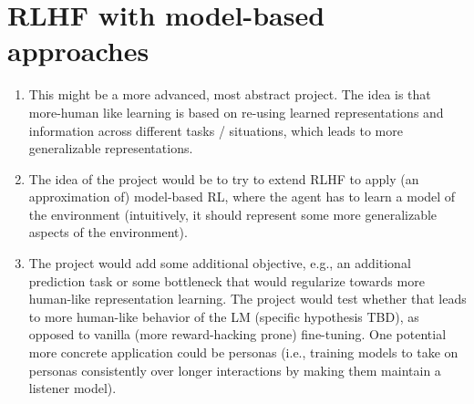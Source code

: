 \documentclass[fleqn,reqno,10pt]{article}
\begin{document}
\section{RLHF with model-based approaches}
\begin{enumerate}
	\item This might be a more advanced, most abstract project. The idea is that more-human like learning is based on re-using learned representations and information across different tasks / situations, which leads to more generalizable representations. 
	\item The idea of the project would be to try to extend RLHF to apply (an approximation of) model-based RL, where the agent has to learn a model of the environment (intuitively, it should represent some more generalizable aspects of the environment). 
	\item The project would add some additional objective, e.g., an additional prediction task or some bottleneck that would regularize towards more human-like representation learning. The project would test whether that leads to more human-like behavior of the LM (specific hypothesis TBD), as opposed to vanilla (more reward-hacking prone) fine-tuning.  One potential more concrete application could be personas (i.e., training models to take on personas consistently over longer interactions by making them maintain a listener model).
\end{enumerate}

\printbibliography[heading=bibintoc]
\end{document}
